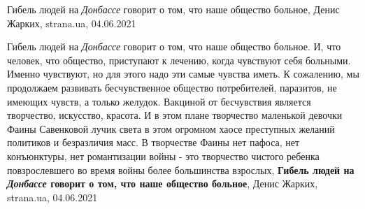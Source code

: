 Гибель людей на \emph{Донбассе} говорит о том, что наше общество больное,
Денис Жарких, strana.ua, 04.06.2021

Гибель людей на \emph{Донбассе} говорит о том, что наше общество больное. И, что
человек, что общество, приступают к лечению, когда чувствуют себя больными.
Именно чувствуют, но для этого надо эти самые чувства иметь. К сожалению, мы
продолжаем развивать бесчувственное общество потребителей, паразитов, не
имеющих чувств, а только желудок.  Вакциной от бесчувствия является творчество,
искусство, красота. И в этом плане творчество маленькой девочки Фаины
Савенковой лучик света в этом огромном хаосе преступных желаний политиков и
безразличия масс. В творчестве Фаины нет пафоса, нет конъюнктуры, нет
романтизации войны - это творчество чистого ребенка повзрослевшего во время
войны более большинства взрослых,
\textbf{Гибель людей на \emph{Донбассе} говорит о том, что наше общество больное},
Денис Жарких, strana.ua, 04.06.2021


